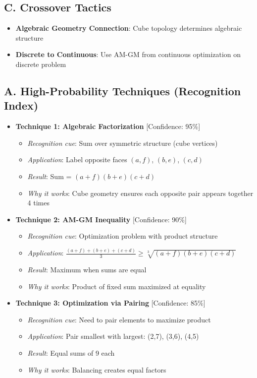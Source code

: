 \documentclass[]{article}
\begin{document}
\begin{tacticalbox}
\subsection*{C. Crossover Tactics}
\begin{itemize}[leftmargin=*]
    \item \textbf{Algebraic Geometry Connection}: Cube topology determines algebraic structure
    \item \textbf{Discrete to Continuous}: Use AM-GM from continuous optimization on discrete problem
\end{itemize}
\end{tacticalbox}

\begin{techniquesbox}
\subsection*{A. High-Probability Techniques (Recognition Index)}
\begin{itemize}[leftmargin=*]
    \item \textbf{Technique 1: Algebraic Factorization} [Confidence: 95\%]
    \begin{itemize}
        \item \textit{Recognition cue}: Sum over symmetric structure (cube vertices)
        \item \textit{Application}: Label opposite faces $(a,f)$, $(b,e)$, $(c,d)$
        \item \textit{Result}: Sum = $(a+f)(b+e)(c+d)$
        \item \textit{Why it works}: Cube geometry ensures each opposite pair appears together 4 times
    \end{itemize}
    
    \item \textbf{Technique 2: AM-GM Inequality} [Confidence: 90\%]
    \begin{itemize}
        \item \textit{Recognition cue}: Optimization problem with product structure
        \item \textit{Application}: $\frac{(a+f)+(b+e)+(c+d)}{3} \geq \sqrt[3]{(a+f)(b+e)(c+d)}$
        \item \textit{Result}: Maximum when sums are equal
        \item \textit{Why it works}: Product of fixed sum maximized at equality
    \end{itemize}
    
    \item \textbf{Technique 3: Optimization via Pairing} [Confidence: 85\%]
    \begin{itemize}
        \item \textit{Recognition cue}: Need to pair elements to maximize product
        \item \textit{Application}: Pair smallest with largest: (2,7), (3,6), (4,5)
        \item \textit{Result}: Equal sums of 9 each
        \item \textit{Why it works}: Balancing creates equal factors
    \end{itemize}
\end{itemize}


\end{techniquesbox}
\end{document}
